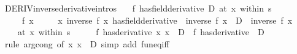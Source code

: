 \begin{isabellebody}
\endisatagproof
{\isafoldproof}%
%
\isadelimproof
\isanewline
%
\endisadelimproof
\isanewline
{}\isamarkupfalse%
\ DERIV{\isacharunderscore}{\kern0pt}inverse{\isacharprime}{\kern0pt}{\isacharbrackleft}{\kern0pt}derivative{\isacharunderscore}{\kern0pt}intros{\isacharbrackright}{\kern0pt}{\isacharcolon}{\kern0pt}\isanewline
\ \ \ {\isachardoublequoteopen}{\isacharparenleft}{\kern0pt}f\ has{\isacharunderscore}{\kern0pt}field{\isacharunderscore}{\kern0pt}derivative\ D{\isacharparenright}{\kern0pt}\ {\isacharparenleft}{\kern0pt}at\ x\ within\ s{\isacharparenright}{\kern0pt}{\isachardoublequoteclose}\isanewline
\ \ \ \ \ {\isachardoublequoteopen}f\ x\ {\isasymnoteq}\ {}{\isachardoublequoteclose}\isanewline
\ \ \ {\isachardoublequoteopen}{\isacharparenleft}{\kern0pt}{\isacharparenleft}{\kern0pt}{\isasymlambda}x{\isachardot}{\kern0pt}\ inverse\ {\isacharparenleft}{\kern0pt}f\ x{\isacharparenright}{\kern0pt}{\isacharparenright}{\kern0pt}\ has{\isacharunderscore}{\kern0pt}field{\isacharunderscore}{\kern0pt}derivative\ {\isacharminus}{\kern0pt}\ {\isacharparenleft}{\kern0pt}inverse\ {\isacharparenleft}{\kern0pt}f\ x{\isacharparenright}{\kern0pt}\ {\isacharasterisk}{\kern0pt}\ D\ {\isacharasterisk}{\kern0pt}\ inverse\ {\isacharparenleft}{\kern0pt}f\ x{\isacharparenright}{\kern0pt}{\isacharparenright}{\kern0pt}{\isacharparenright}{\kern0pt}\isanewline
\ \ \ \ {\isacharparenleft}{\kern0pt}at\ x\ within\ s{\isacharparenright}{\kern0pt}{\isachardoublequoteclose}\isanewline
%
\isadelimproof
%
\endisadelimproof
%
\isatagproof
{}\isamarkupfalse%
\ {\isacharminus}{\kern0pt}\isanewline
\ \ \isamarkupfalse%
\ {\isachardoublequoteopen}{\isacharparenleft}{\kern0pt}f\ has{\isacharunderscore}{\kern0pt}derivative\ {\isacharparenleft}{\kern0pt}{\isasymlambda}x{\isachardot}{\kern0pt}\ x\ {\isacharasterisk}{\kern0pt}\ D{\isacharparenright}{\kern0pt}{\isacharparenright}{\kern0pt}\ {\isacharequal}{\kern0pt}\ {\isacharparenleft}{\kern0pt}f\ has{\isacharunderscore}{\kern0pt}derivative\ {\isacharparenleft}{\kern0pt}{\isacharasterisk}{\kern0pt}{\isacharparenright}{\kern0pt}\ D{\isacharparenright}{\kern0pt}{\isachardoublequoteclose}\isanewline
\ \ \ \ \isamarkupfalse%
\ {\isacharparenleft}{\kern0pt}rule\ arg{\isacharunderscore}{\kern0pt}cong\ {\isacharbrackleft}{\kern0pt}of\ {\isachardoublequoteopen}{\isasymlambda}x{\isachardot}{\kern0pt}\ x\ {\isacharasterisk}{\kern0pt}\ D{\isachardoublequoteclose}{\isacharbrackright}{\kern0pt}{\isacharparenright}{\kern0pt}\ {\isacharparenleft}{\kern0pt}simp\ add{\isacharcolon}{\kern0pt}\ fun{\isacharunderscore}{\kern0pt}eq{\isacharunderscore}{\kern0pt}iff{\isacharparenright}{\kern0pt}\isanewline

\end{isabellebody}
